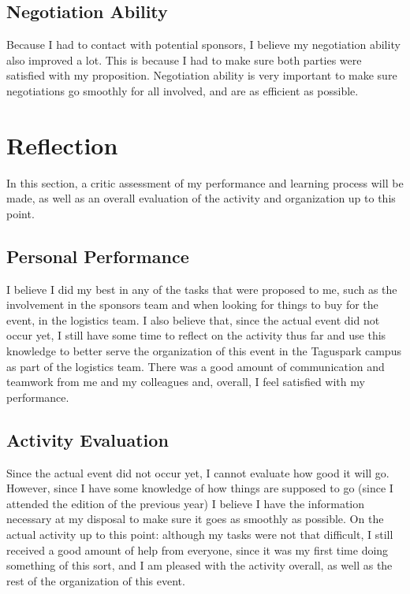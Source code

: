 \documentclass[a4paper,12pt,journal,twoside,compsoc]{PPIEEEtran}
\begin{document}
\subsection{Negotiation Ability}

Because I had to contact with potential sponsors, I believe my negotiation ability also improved a lot. This is because I had to make sure both parties were satisfied with my proposition. Negotiation ability is very important to make sure negotiations go smoothly for all involved, and are as efficient as possible. 


\section{Reflection}
\label{reflection}

In this section, a critic assessment of my performance and learning process will be made, as well as an overall evaluation of the activity and organization up to this point.

\subsection{Personal Performance}

I believe I did my best in any of the tasks that were proposed to me, such as the involvement in the sponsors team and when looking for things to buy for the event, in the logistics team. I also believe that, since the actual event did not occur yet, I still have some time to reflect on the activity thus far and use this knowledge to better serve the organization of this event in the Taguspark campus as part of the logistics team. There was a good amount of communication and teamwork from me and my colleagues and, overall, I feel satisfied with my performance.

\subsection{Activity Evaluation}

Since the actual event did not occur yet, I cannot evaluate how good it will go. However, since I have some knowledge of how things are supposed to go (since I attended the edition of the previous year) I believe I have the information necessary at my disposal to make sure it goes as smoothly as possible. 
On the actual activity up to this point: although my tasks were not that difficult, I still received a good amount of help from everyone, since it was my first time doing something of this sort, and I am pleased with the activity overall, as well as the rest of the organization of this event.
\end{document}
